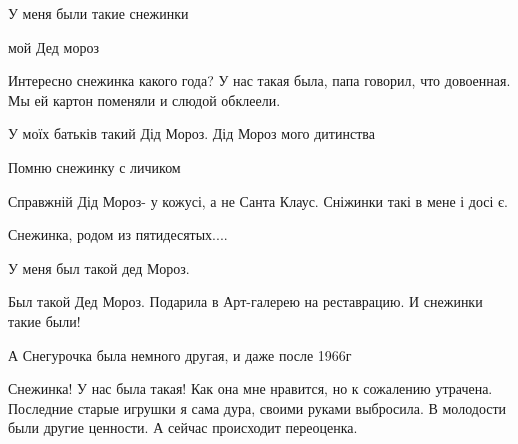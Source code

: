 
 
 
 
 

У меня были такие снежинки

мой Дед мороз


Интересно снежинка какого года? У нас такая была, папа говорил, что довоенная.
Мы ей картон поменяли и слюдой обклеели.

У моїх батьків такий Дід Мороз. Дід Мороз мого дитинства

Помню снежинку с личиком

Справжній Дід Мороз- у кожусі, а не Санта Клаус. Сніжинки такі в мене і досі є.

Снежинка, родом из пятидесятых....

У меня был такой дед Мороз.

Был такой Дед Мороз. Подарила в Арт-галерею на реставрацию. И снежинки такие были!

А Снегурочка была немного другая, и даже после 1966г


Снежинка! У нас была такая! Как она мне нравится, но к сожалению утрачена.
Последние старые игрушки я сама дура, своими руками выбросила. В молодости были
другие ценности. А сейчас происходит переоценка.
